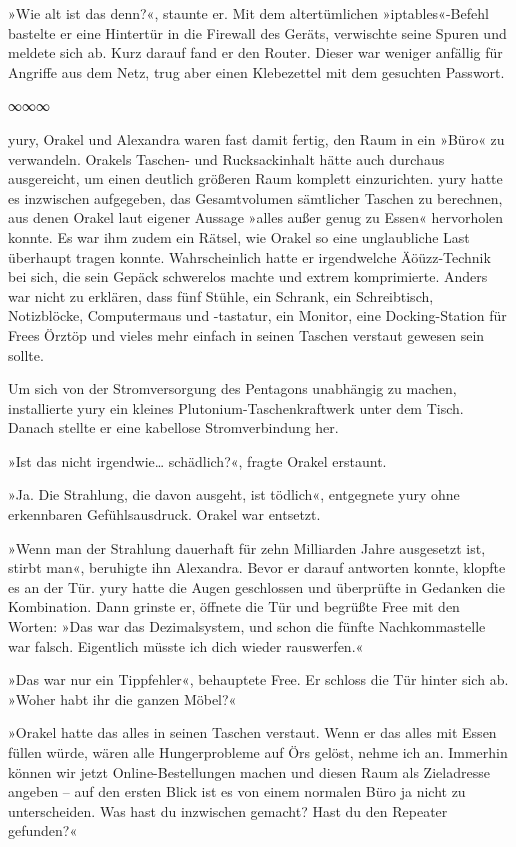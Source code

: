 »Wie alt ist das denn?«, staunte er. Mit dem altertümlichen »iptables«-Befehl bastelte er eine Hintertür in die Firewall des Geräts, verwischte seine Spuren und meldete sich ab. Kurz darauf fand er den Router. Dieser war weniger anfällig für Angriffe aus dem Netz, trug aber einen Klebezettel mit dem gesuchten Passwort.

\begin{center}
	∞∞∞
\end{center}

yury, Orakel und Alexandra waren fast damit fertig, den Raum in ein »Büro« zu verwandeln. Orakels Taschen- und Rucksackinhalt hätte auch durchaus ausgereicht, um einen deutlich größeren Raum komplett einzurichten. yury hatte es inzwischen aufgegeben, das Gesamtvolumen sämtlicher Taschen zu berechnen, aus denen Orakel laut eigener Aussage »alles außer genug zu Essen« hervorholen konnte. Es war ihm zudem ein Rätsel, wie Orakel so eine unglaubliche Last überhaupt tragen konnte. Wahrscheinlich hatte er irgendwelche Äöüzz-Technik bei sich, die sein Gepäck schwerelos machte und extrem komprimierte. Anders war nicht zu erklären, dass fünf Stühle, ein Schrank, ein Schreibtisch, Notizblöcke, Computermaus und -tastatur, ein Monitor, eine Docking-Station für Frees Örztöp und vieles mehr einfach in seinen Taschen verstaut gewesen sein sollte.

Um sich von der Stromversorgung des Pentagons unabhängig zu machen, installierte yury ein kleines Plutonium-Taschenkraftwerk unter dem Tisch. Danach stellte er eine kabellose Stromverbindung her.

»Ist das nicht irgendwie… schädlich?«, fragte Orakel erstaunt.

»Ja. Die Strahlung, die davon ausgeht, ist tödlich«, entgegnete yury ohne erkennbaren Gefühlsausdruck. Orakel war entsetzt.

»Wenn man der Strahlung dauerhaft für zehn Milliarden Jahre ausgesetzt ist, stirbt man«, beruhigte ihn Alexandra. Bevor er darauf antworten konnte, klopfte es an der Tür. yury hatte die Augen geschlossen und überprüfte in Gedanken die Kombination. Dann grinste er, öffnete die Tür und begrüßte Free mit den Worten: »Das war das Dezimalsystem, und schon die fünfte Nachkommastelle war falsch. Eigentlich müsste ich dich wieder rauswerfen.«

»Das war nur ein Tippfehler«, behauptete Free. Er schloss die Tür hinter sich ab. »Woher habt ihr die ganzen Möbel?«

»Orakel hatte das alles in seinen Taschen verstaut. Wenn er das alles mit Essen füllen würde, wären alle Hungerprobleme auf Örs gelöst, nehme ich an. Immerhin können wir jetzt Online-Bestellungen machen und diesen Raum als Zieladresse angeben – auf den ersten Blick ist es von einem normalen Büro ja nicht zu unterscheiden. Was hast du inzwischen gemacht? Hast du den Repeater gefunden?«

